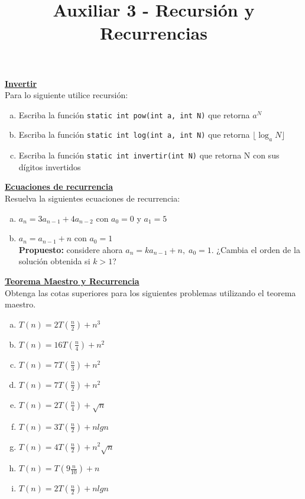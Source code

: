 \documentclass[dcc,uchile,sol]{fcfmcourse}
\title{Auxiliar 3 - Recursión y Recurrencias}
\newcommand{\ptitle}[1]{\underline{\textbf{#1}}}
\begin{document}
\maketitle

\vspace{-1ex}


\begin{problems}
\problem \ptitle{Invertir}\\
Para lo siguiente utilice recursión:
\begin{enumerate}[a)]
\item Escriba la función \texttt{static int pow(int a, int N)} que retorna $a^N$
\item Escriba la función \texttt{static int log(int a, int N)} que retorna $\lfloor \log_{a}N \rfloor$
\item Escriba la función \texttt{static int invertir(int N)} que retorna N con sus dígitos invertidos
\end{enumerate}


\problem \ptitle{Ecuaciones de recurrencia}\\
Resuelva la siguientes ecuaciones de recurrencia:

\begin{enumerate}[a)]
    \item $a_n = 3a_{n-1} + 4a_{n-2}$ con $a_0 = 0$ y $a_1 = 5$ 
    \item $a_n = a_{n-1} + n$ con $a_0 = 1$ \\
    \textbf{Propuesto:} considere ahora $a_n = ka_{n-1} + n, \; a_0 = 1$. ¿Cambia el orden de la solución obtenida si $k>1$?
\end{enumerate}

\problem \ptitle{Teorema Maestro y Recurrencia}\\
Obtenga las cotas superiores para los siguientes problemas utilizando el teorema maestro.
\begin{enumerate}[a)]
    \item $T(n)=2T(\frac{n}{2})+n^3$
    \item $T(n)=16T(\frac{n}{4})+n^2$
    \item $T(n)=7T(\frac{n}{3})+n^2$
    \item $T(n)=7T(\frac{n}{2})+n^2$
    \item $T(n)=2T(\frac{n}{4})+\sqrt{n}$
    \item $T(n)=3T(\frac{n}{2})+nlgn$
    \item $T(n)=4T(\frac{n}{2})+n^2\sqrt{n}$
    \item $T(n)=T(9\frac{n}{10})+n$
    \item $T(n)=2T(\frac{n}{2})+nlgn$
\end{enumerate}


\end{problems}
\end{document}
